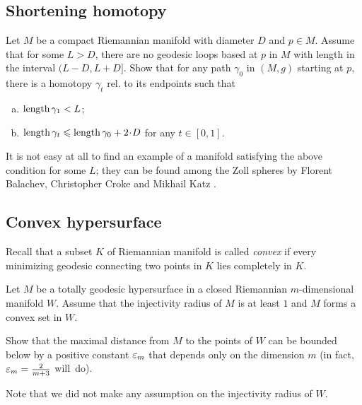 \subsection*{Shortening homotopy}
\label{short-homotopy}

\begin{pr}
Let $M$ be a compact Riemannian manifold with diameter $D$ and $p\in M$.
Assume that for some $L>D$,
there are no geodesic loops based at $p$ in $M$
with length in the interval $(L-D,L+ D]$.
Show that for any path $\gamma_0$ in $(M,g)$ starting at $p$, 
there is a homotopy $\gamma_t$ rel. to its endpoints
such that 
\begin{enumerate}[a)]
\item $\operatorname{\rm length} \gamma_1<L$;
\item $\length \gamma_t\le \length \gamma_0+2\cdot D$ for any $t\in[0,1]$.
 
\end{enumerate}
\end{pr}

It is not easy at all to find an example of a manifold satisfying the above condition for some $L$;
they can be found among the Zoll spheres
by Florent Balachev, Christopher Croke and Mikhail Katz \cite[see][]{balacheff-croke-katz}.



\subsection*{Convex hypersurface}
\label{Convex hypersurface}

Recall that a subset $K$ of Riemannian manifold is called \emph{convex} if every minimizing geodesic connecting two  points in $K$ lies completely in $K$. 

\begin{pr}
Let $M$ be a totally geodesic hypersurface 
in a closed Riemannian $m$-dimensional manifold $W$.
Assume that the injectivity radius of $M$ is at least $1$
and $M$ forms a convex set in $W$.

Show that the maximal distance from $M$ to the points of $W$ can be bounded below by a positive constant $\varepsilon_m$ that depends only on the dimension $m$ (in fact, $\varepsilon_m=\tfrac2{m+3}$ will~do).
\end{pr}

Note that we did not make any assumption on the injectivity radius of $W$.

